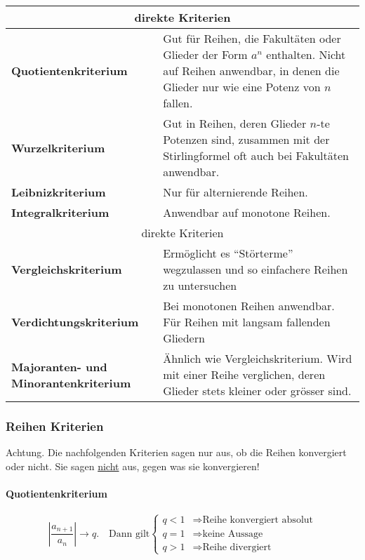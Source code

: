 \begin{tabular}{|p{4cm}|p{15cm}|}\hline
\multicolumn{2}{|c|}{direkte Kriterien}\\ \hline

\textbf{Quotientenkriterium} & Gut für Reihen, die Fakultäten oder Glieder der
Form $a^n$ enthalten. Nicht auf Reihen anwendbar, in denen die Glieder nur wie
eine Potenz von $n$ fallen. \\ \hline

\textbf{Wurzelkriterium} & Gut in Reihen, deren Glieder $n$-te Potenzen sind,
zusammen mit der Stirlingformel oft auch bei Fakultäten anwendbar. \\ \hline

\textbf{Leibnizkriterium} & Nur für alternierende Reihen.\\ \hline

\textbf{Integralkriterium} & Anwendbar auf monotone Reihen.\\ \hline

\multicolumn{2}{|c|}{direkte Kriterien}\\ \hline

\textbf{Vergleichskriterium} & Ermöglicht es "`Störterme"' wegzulassen und so
einfachere Reihen zu untersuchen \\ \hline

\textbf{Verdichtungskriterium} & Bei monotonen Reihen anwendbar. Für Reihen mit
langsam fallenden Gliedern \\ \hline

\textbf{Majoranten- und Minorantenkriterium} & Ähnlich wie Vergleichskriterium.
Wird mit einer Reihe verglichen, deren Glieder stets kleiner oder grösser sind.
\\ \hline
\end{tabular}

\begin{multicols}{2}
\subsubsection{Reihen Kriterien}
Achtung. Die nachfolgenden Kriterien sagen nur aus, ob die Reihen konvergiert
oder nicht. Sie sagen \underline{nicht} aus, gegen was sie konvergieren!

\paragraph{Quotientenkriterium}
\[
\left| \frac{a_{n+1}}{a_n} \right| \to q. \quad \text{Dann gilt} \begin{cases}
q < 1 & \Rightarrow \text{Reihe konvergiert absolut} \\
q = 1 & \Rightarrow \text{keine Aussage}\\
q > 1 & \Rightarrow \text{Reihe divergiert}
\end{cases}
\]

\end{multicols}
